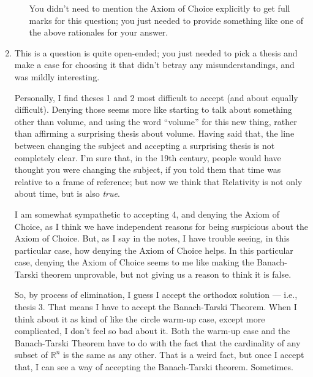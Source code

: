 \documentclass[12pt,a4paper]{article}
\begin{document}
\begin{enumerate}
\begin{enumerate}
	You didn't need to mention the Axiom of Choice explicitly to get full marks for this question; you just needed to provide something like one of the above rationales for your answer.
	
	\end{enumerate}
	
\item This is a question is quite open-ended; you just needed to pick a thesis and make a case for choosing it that didn't betray any misunderstandings, and was mildly interesting. 

Personally, I find theses 1 and 2 most difficult to accept (and about equally difficult). Denying those seems more like starting to talk about something other than volume, and using the word ``volume'' for this new thing, rather than affirming a surprising thesis about volume. Having said that, the line between changing the subject and accepting a surprising thesis is not completely clear. I'm sure that, in the 19th century, people would have thought you were changing the subject, if you told them that time was relative to a frame of reference; but now we think that Relativity is not only about time, but is also \emph{true}.

I am somewhat sympathetic to accepting 4, and denying the Axiom of Choice, as I think we have independent reasons for being suspicious about the Axiom of Choice. But, as I say in the notes, I have trouble seeing, in this particular case, how denying the Axiom of Choice helps. In this particular case, denying the Axiom of Choice seems to me like making the Banach-Tarski theorem unprovable, but not giving us a reason to think it is false.

So, by process of elimination, I guess I accept the orthodox solution --- i.e., thesis 3. That means I have to accept the Banach-Tarski Theorem. When I think about it as kind of like the circle warm-up case, except more complicated, I don't feel so bad about it. Both the warm-up case and the Banach-Tarski Theorem have to do with the fact that the cardinality of any subset of $\mathbb{R}^n$ is the same as any other. That is a weird fact, but once I accept that, I can see a way of accepting the Banach-Tarski theorem. Sometimes.

\end{enumerate}
\end{document}
